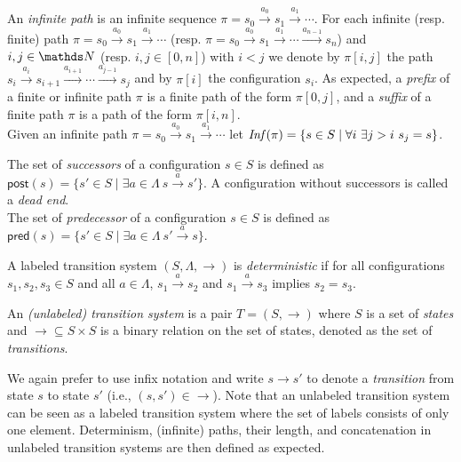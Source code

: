 An {\em infinite path} is an infinite sequence
 $\pi = s_0 \xrightarrow{a_0 } s_1 \xrightarrow{a_1 } \cdots $.
For each infinite (resp. finite) path  $\pi = s_0 \xrightarrow{a_0 } s_1 \xrightarrow{a_1 } \cdots$ 
(resp. $\pi = s_0 \xrightarrow{a_0 } s_1 \xrightarrow{a_1 } \cdots \xrightarrow{a_{n-1}} s_n$)
and $i,j \in \N$ (resp. $i,j \in [0,n]$) with $i<j$ we denote
by $\pi[i,j]$ the path 
$s_i  \xrightarrow{a_i } s_{i+1}  \xrightarrow{a_{i+1} } \cdots  \xrightarrow{a_{j-1} } s_j$
 and by $\pi[i]$ the configuration $s_i$.
As expected, a {\em prefix} of a finite or infinite path $\pi$ is a finite path of the form $\pi[0,j]$, and
a  {\em suffix} of a finite path $\pi$ is a path of the form $\pi[i,n]$.  \\
Given an infinite path $\pi = s_0 \xrightarrow{a_0 } s_1 \xrightarrow{a_1 } \cdots$ let
$\text{\textit{Inf}}(\pi) = \{ s \in S \mid \forall i ~ \exists j > i ~ s_j = s\}$.

\newcommand{\pred}{\textsf{pred}}
\newcommand{\post}{\textsf{post}}


\noindent
The set of {\em successors} of a configuration $s \in S$ is deﬁned as
$\post(s) = \{ s' \in S \mid \exists a \in \Lambda ~ s \xrightarrow{a} s'\}$.
A configuration without successors is called a {\em dead end}.  \\
The set of {\em predecessor} of a configuration $s \in S$ is deﬁned as
$\pred(s) = \{ s' \in S \mid \exists a \in \Lambda ~ s' \xrightarrow{a} s\}$.



A labeled transition system $(S, \Lambda, \rightarrow)$ is {\em deterministic} if for all configurations $s_1, s_2, s_3 \in S$ and all
$a \in \Lambda$,
 $ s_1  \xrightarrow{a} s_{2}$ and  
 $s_1  \xrightarrow{a} s_{3} $ implies $s_2 = s_3 $. \\



\begin{definition}
An {\em (unlabeled) transition system} is a pair $T = (S,\rightarrow )$ where $S$ is a set of 
{\em states} and  
$ {\rightarrow} \subseteq S \times S$ is a
binary relation 
on
the set of states, denoted as the set of {\em transitions}. 
\end{definition}

We again prefer to use infix notation and write $s \rightarrow s'$ to denote a {\em transition} from state $s$ to state $s'$ (i.e., $ (s,s') \in  {\rightarrow} $). \newline
Note 
 that an unlabeled transition system can be seen as a labeled transition system where the set of labels consists of only one element. 
Determinism, (infinite) paths, their length, and concatenation in unlabeled transition systems are
then defined as expected.

